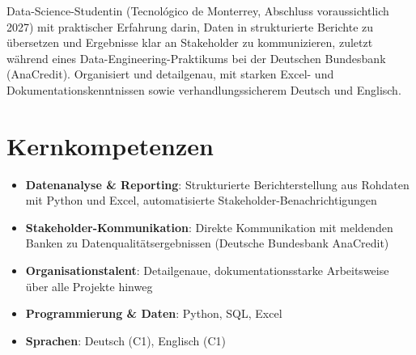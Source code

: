 \documentclass[11pt,a4paper,sans]{moderncv}
\begin{document}
\makecvtitle


\vspace{6pt}
\small{Data-Science-Studentin (Tecnológico de Monterrey, Abschluss voraussichtlich 2027) mit praktischer Erfahrung darin, Daten in strukturierte Berichte zu übersetzen und Ergebnisse klar an Stakeholder zu kommunizieren, zuletzt während eines Data-Engineering-Praktikums bei der Deutschen Bundesbank (AnaCredit). Organisiert und detailgenau, mit starken Excel- und Dokumentationskenntnissen sowie verhandlungssicherem Deutsch und Englisch.}


\section{Kernkompetenzen}
\vspace{1pt}
\begin{itemize}

\item \textbf{Datenanalyse \& Reporting}: Strukturierte Berichterstellung aus Rohdaten mit Python und Excel, automatisierte Stakeholder-Benachrichtigungen

\item \textbf{Stakeholder-Kommunikation}: Direkte Kommunikation mit meldenden Banken zu Datenqualitätsergebnissen (Deutsche Bundesbank AnaCredit)

\item \textbf{Organisationstalent}: Detailgenaue, dokumentationsstarke Arbeitsweise über alle Projekte hinweg

\item \textbf{Programmierung \& Daten}: Python, SQL, Excel

\item \textbf{Sprachen}: Deutsch (C1), Englisch (C1)

\end{itemize}

\end{document}
